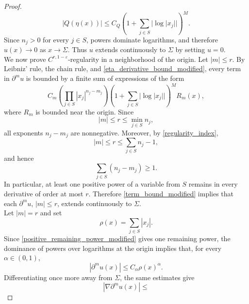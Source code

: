 \documentclass{amsart}
\theoremstyle{plain}
\theoremstyle{definition}
\begin{document}
\begin{proof}
\begin{equation}
        |Q(\eta(x))|
        \le
        C_Q
        \left(
        1+\sum_{j\in S}|\log |x_j||
        \right)^M.
\end{equation}
Since $n_j>0$ for every $j\in S$, powers dominate logarithms, and therefore
$u(x)\to0$ as $x\to\Sigma$. Thus $u$ extends continuously to $\Sigma$ by setting
$u=0$.\\
We now prove $C^{r,1-\varepsilon}$-regularity in a neighborhood of the origin. Let
$|m|\leq r$. By Leibniz' rule, the chain rule, and
\eqref{eta_derivative_bound_modified}, every term in $\partial^m u$ is bounded by a
finite sum of expressions of the form
\begin{equation}\label{term_bound_modified}
        C_m
        \left(
        \prod_{j\in S}|x_j|^{n_j-m_j}
        \right)
        \left(
        1+\sum_{j\in S}|\log |x_j||
        \right)^M
        R_m(x),
\end{equation}
where $R_m$ is bounded near the origin. Since
\begin{equation}
        |m|\leq r\leq \min_{j\in S}n_j,
\end{equation}
all exponents $n_j-m_j$ are nonnegative. Moreover, by \eqref{regularity_index},
\begin{equation}
        |m|\leq r\leq \sum_{j\in S}n_j-1,
\end{equation}
and hence
\begin{equation}\label{positive_remaining_power_modified}
\sum_{j\in S}(n_j-m_j)\geq 1.
\end{equation}
In particular, at least one positive power of a variable from $S$ remains in every
derivative of order at most $r$. Therefore \eqref{term_bound_modified} implies that each
$\partial^m u$, $|m|\leq r$, extends continuously to $\Sigma$.\\
Let $|m|=r$ and set
\begin{equation}
        \rho(x)=\sum_{j\in S}|x_j|.
\end{equation}
Since \eqref{positive_remaining_power_modified} gives one remaining power, the dominance of powers over logarithms at the origin implies that, for every $\alpha\in(0,1)$,
\begin{equation}\label{pointwise_holder_decay_modified}
        |\partial^m u(x)|
        \le
        C_\alpha \rho(x)^\alpha.
\end{equation}
Differentiating once more away from $\Sigma$, the same estimates give
\begin{equation}\label{gradient_holder_bound_modified}
        |\nabla\partial^m u(x)|
        \le

\end{equation}
\end{proof}
\end{document}
